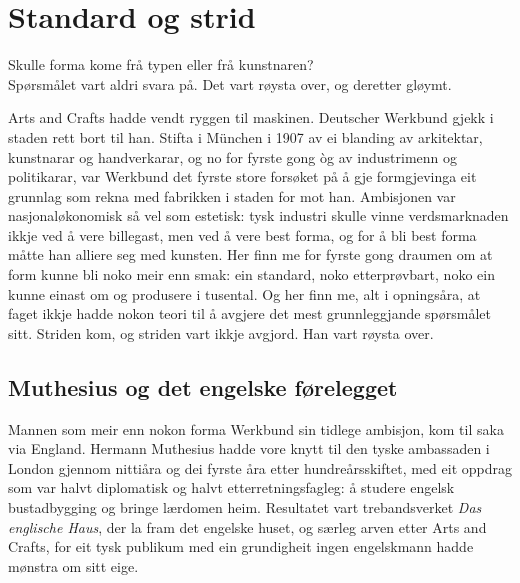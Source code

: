 \chapter{Standard og strid}

\begin{motto}
Skulle forma kome frå typen eller frå kunstnaren?\\ Spørsmålet vart aldri svara på. Det vart røysta over, og deretter gløymt.
\end{motto}

Arts and Crafts hadde vendt ryggen til maskinen. Deutscher Werkbund gjekk i staden rett bort til han. Stifta i München i 1907 av ei blanding av arkitektar, kunstnarar og handverkarar, og no for fyrste gong òg av industrimenn og politikarar, var Werkbund det fyrste store forsøket på å gje formgjevinga eit grunnlag som rekna med fabrikken i staden for mot han. Ambisjonen var nasjonaløkonomisk så vel som estetisk: tysk industri skulle vinne verdsmarknaden ikkje ved å vere billegast, men ved å vere best forma, og for å bli best forma måtte han alliere seg med kunsten. Her finn me for fyrste gong draumen om at form kunne bli noko meir enn smak: ein standard, noko etterprøvbart, noko ein kunne einast om og produsere i tusental. Og her finn me, alt i opningsåra, at faget ikkje hadde nokon teori til å avgjere det mest grunnleggjande spørsmålet sitt. Striden kom, og striden vart ikkje avgjord. Han vart røysta over.


\section{Muthesius og det engelske førelegget}

Mannen som meir enn nokon forma Werkbund sin tidlege ambisjon, kom til saka via England. Hermann Muthesius hadde vore knytt til den tyske ambassaden i London gjennom nittiåra og dei fyrste åra etter hundreårsskiftet, med eit oppdrag som var halvt diplomatisk og halvt etterretningsfagleg: å studere engelsk bustadbygging og bringe lærdomen heim. Resultatet vart trebandsverket \textit{Das englische Haus}, der \textcite{muthesius1904} la fram det engelske huset, og særleg arven etter Arts and Crafts, for eit tysk publikum med ein grundigheit ingen engelskmann hadde mønstra om sitt eige.

